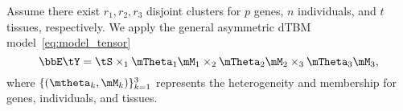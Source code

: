 \documentclass[lettersize,onecolumn,journal]{IEEEtran}
\theoremstyle{definition}
\theoremstyle{definition}
\begin{document}
Assume there exist $r_1, r_2, r_3$ disjoint clusters for $p$ genes, $n$ individuals, and $t$ tissues, respectively. We apply the general asymmetric dTBM model~\eqref{eq:model_tensor} 
\begin{equation}
    \bbE\tY = \tS \times_1 \mTheta_1 \mM_1 \times_2 \mTheta_2 \mM_2 \times_3 \mTheta_3 \mM_3, 
\end{equation}
where $\{(\mtheta_k, \mM_k)\}_{k=1}^3$ represents the heterogeneity and membership for genes, individuals, and tissues. 
\vspace{0.2cm}


\end{document}
